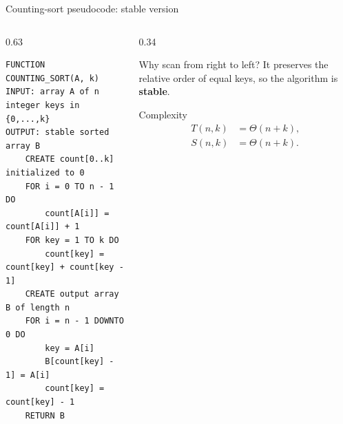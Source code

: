 \documentclass[aspectratio=169]{beamer}
\begin{document}
\begin{frame}[fragile]{Counting-sort pseudocode: stable version}
\scriptsize
\begin{columns}[T,onlytextwidth]
  \begin{column}{0.63\textwidth}
\begin{lstlisting}[style=pseudonumbered,basicstyle=\ttfamily\scriptsize]
FUNCTION COUNTING_SORT(A, k)
INPUT: array A of n integer keys in {0,...,k}
OUTPUT: stable sorted array B
    CREATE count[0..k] initialized to 0
    FOR i = 0 TO n - 1 DO
        count[A[i]] = count[A[i]] + 1
    FOR key = 1 TO k DO
        count[key] = count[key] + count[key - 1]
    CREATE output array B of length n
    FOR i = n - 1 DOWNTO 0 DO
        key = A[i]
        B[count[key] - 1] = A[i]
        count[key] = count[key] - 1
    RETURN B
\end{lstlisting}
  \end{column}
  \begin{column}{0.34\textwidth}
    \begin{block}{Why scan from right to left?}
      It preserves the relative order of equal keys, so the algorithm is
      \textbf{stable}.
    \end{block}
    \begin{exampleblock}{Complexity}
      \[
      \begin{aligned}
        T(n,k) &= \Theta(n+k),\\
        S(n,k) &= \Theta(n+k).
      \end{aligned}
      \]
    \end{exampleblock}
  \end{column}
\end{columns}
\end{frame}
\end{document}

